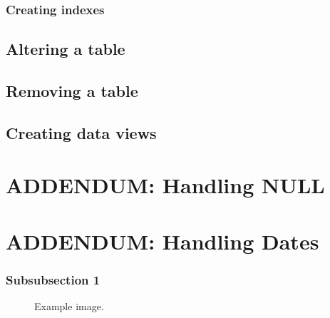 \documentclass[12pt]{article} %
\begin{document}

\subsubsection{Creating indexes} %


\subsection{Altering a table} %


\subsection{Removing a table} %


\subsection{Creating data views} %


\section{ADDENDUM: Handling NULL} %


\section{ADDENDUM: Handling Dates} %



\subsubsection{Subsubsection 1} %

\lipsum[3] %

\begin{figure}[H] %
\caption{Example image.}
\label{fig:speciation}
\end{figure}
\end{document}
